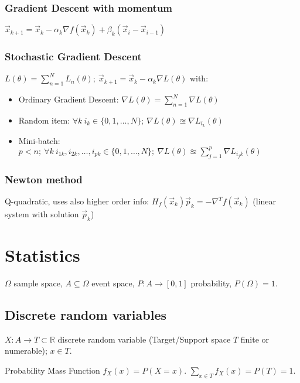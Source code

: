 \documentclass[]{article}
\begin{document}
	\subsubsection{Gradient Descent with momentum}
	
	$\vec{x}_{k+1} = \vec{x}_k - \alpha_k \nabla f(\vec{x}_k) + \beta_k (\vec{x}_i - \vec{x}_{i-1})$
	
	\subsubsection{Stochastic Gradient Descent}
	
	$L(\theta)=\sum\limits_{n=1}^N L_n(\theta); \ \vec{x}_{k+1} = \vec{x}_k - \alpha_k \nabla L(\theta)$ with:
	\begin{itemize}
		\item Ordinary Gradient Descent: $\nabla L(\theta) = \sum\limits_{n=1}^N \nabla L(\theta)$ 
		\item Random item: $\forall k \ i_k\in\{0,1,\dots,N\}; \ \nabla L(\theta) \approxeq \nabla L_{i_k}(\theta)$
		\item Mini-batch: $p < n; \ \forall k \ i_{1k},i_{2k},\dots,i_{pk}\in\{0,1,\dots,N\}; \ \nabla L(\theta) \approxeq \sum\limits_{j=1}^p \nabla L_{i_jk}(\theta)$
	\end{itemize}
	 
	
	\subsubsection{Newton method}
	
	Q-quadratic, uses also higher order info:
	$H_f(\vec{x}_k)\vec{p}_k = -\nabla^T f(\vec{x}_k)$ (linear system with solution $\vec{p}_k$)
	
	
	\section{Statistics}
	
	$\Omega$ sample space, $A \subseteq \Omega$ event space, $P:A\to[0,1]$ probability, $P(\Omega)=1$.
	
	\subsection{Discrete random variables}
	
	$X:A\to T\subset\mathbb{R}$ discrete random variable (Target/Support space $T$ finite or numerable); $x\in T$.
	
	Probability Mass Function $f_X(x) = P(X=x)$.
	$\sum\limits_{x \in T} f_X(x) = P(T) = 1$.
	
\end{document}
